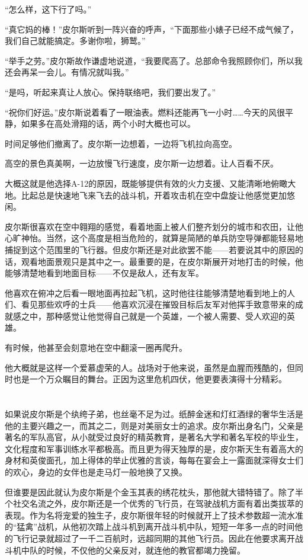 “怎么样，这下行了吗。”

“真它妈的棒！”皮尔斯听到一阵兴奋的呼声，“下面那些小婊子已经不成气候了，我们自己就能搞定。多谢你啦，狮鹫。”

“举手之劳。”皮尔斯故作谦虚地说道，“我要爬高了。总部命令我照顾你们，所以我还会再呆一会儿。有情况就叫我。”

“是吗，听起来真让人放心。保持联络吧，我们要出发了。”

“祝你们好运。”皮尔斯说着看了一眼油表。燃料还能再飞一小时……今天的风很平静，如果多在高处滑翔的话，两个小时大概也可以。

时间足够他们撤离了。皮尔斯一边想着，一边将飞机拉向高空。

高空的景色真美啊，一边放慢飞行速度，皮尔斯一边想着。让人百看不厌。

大概这就是他选择A-12的原因，既能够提供有效的火力支援、又能清晰地俯瞰大地。比起总是快速地飞来飞去的战斗机，开着攻击机在空中盘旋让他感觉更加悠闲。

皮尔斯很喜欢在空中翱翔的感觉，看着地面上被人们整齐划分的城市和农田，让他心旷神怡。当然，这个高度是相当危险的，就算是简陋的单兵防空导弹都能轻易地捕捉到这个范围里的飞行器。但皮尔斯还是对此欲罢不能——若要说其中的原因的话，观看地面景观只是其中之一。最重要的是，在皮尔斯展开对地打击的时候，他能够清楚地看到地面目标——不仅是敌人，还有友军。

他喜欢在俯冲之后看一眼地面再拉起飞机，这时他往往能够清楚地看到地上的人们、看见那些欢呼的士兵——他喜欢沉浸在摧毁目标后友军对他挥手致意带来的成就感之中，那种感觉让他觉得自己就是一个英雄，一个被人需要、受人欢迎的英雄。

有时候，他甚至会刻意地在空中翻滚一圈再爬升。

他大概就是这样一个爱慕虚荣的人。战场对于他来说，虽然是血腥而残酷的，但同时也是一个万众瞩目的舞台。正因为这里危机四伏，他更要表演得十分精彩。

\section*{}

如果说皮尔斯是个纨绔子弟，也丝毫不足为过。纸醉金迷和灯红酒绿的奢华生活是他的主要兴趣之一，而其之二，则是对美丽女士的追求。皮尔斯出身名门，父亲是著名的军队高官，从小就受过良好的精英教育，是著名大学和著名军校的毕业生，文化程度和军事训练水平都极高。而且更为得天独厚的是，皮尔斯天生有着高大的身材和英俊面孔，加上得体的举止优雅的言谈，每每在宴会上一露面就深得女士们的欢心，身边的女伴也是走马灯一般地换了又换。

但谁要是因此就认为皮尔斯是个金玉其表的绣花枕头，那他就大错特错了。除了半个社交名流之外，皮尔斯还是一个优秀的飞行员，在驾驶战机方面有着出类拔萃的表现。作为名将宠爱的独生子，皮尔斯很年轻的时候就开上了技术参数超一流水准的“猛禽”战机，从他初次踏上战斗机到离开战斗机中队，短短一年多一点的时间他的飞行记录就超过了一千二百航时，远超同期的其他飞行员。因此在他要求离开战斗机中队的时候，不仅他的父亲反对，就连他的教官都竭力挽留。

